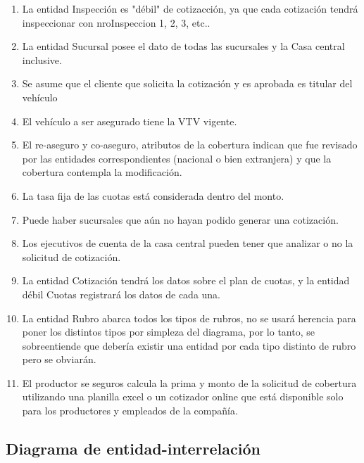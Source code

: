 \documentclass[a4paper,11pt]{article}
\begin{document}
\begin{enumerate}
 
	\item La entidad Inspección es "débil" de cotizacción, ya que cada cotización tendrá inspeccionar con nroInspeccion 1, 2, 3, etc..
 
	\item La entidad Sucursal posee el dato de todas las sucursales y la Casa central inclusive.

	\item Se asume que el cliente que solicita la cotización y es aprobada es titular del vehículo
	
	\item El vehículo a ser asegurado tiene la VTV vigente.

	\item El re-aseguro y co-aseguro, atributos de la cobertura indican que fue revisado por las entidades correspondientes (nacional o bien extranjera) y que la cobertura contempla la modificación.

	\item La tasa fija de las cuotas está considerada dentro del monto.

	\item Puede haber sucursales que aún no hayan podido generar una cotización.

	\item Los ejecutivos de cuenta de la casa central pueden tener que analizar o no la solicitud de cotización.  

	\item La entidad Cotización tendrá los datos sobre el plan de cuotas, y la entidad débil Cuotas registrará los datos de cada una.
 
	\item La entidad Rubro abarca todos los tipos de rubros, no se usará herencia para poner los distintos tipos por simpleza del diagrama, por lo tanto, se sobreentiende que debería existir una entidad por cada tipo distinto de rubro pero se obviarán.
	
	\item El productor se seguros calcula la prima y monto de la solicitud de cobertura utilizando una planilla excel o un cotizador online que está disponible solo para los productores y empleados de la compañía.
  
\end{enumerate}


\subsection{Diagrama de entidad-interrelación}
\end{document}
